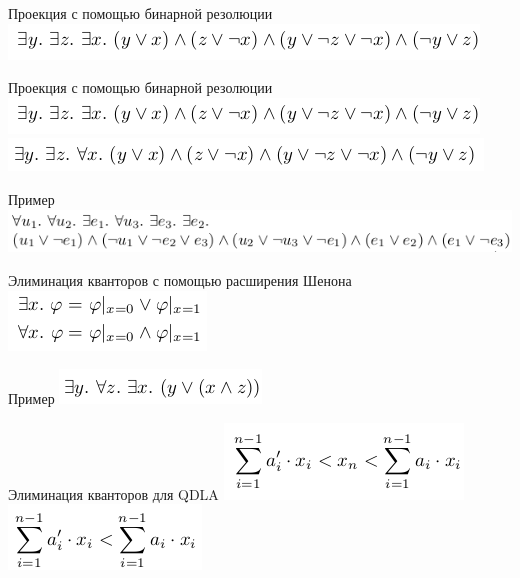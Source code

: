 \documentclass{beamer}
\begin{document}
\begin{frame}{Проекция с помощью бинарной резолюции}
\includegraphics[scale=0.5]{reduction1.png}\newline
\end{frame}

\begin{frame}{Проекция с помощью бинарной резолюции}
\includegraphics[scale=0.5]{reduction1.png}\newline
\includegraphics[scale=0.5]{reduction2.png}\newline
\end{frame}

\begin{frame}{Пример}
\includegraphics[scale=0.5]{reduction_ex.png}\newline
\end{frame}

\begin{frame}{Элиминация кванторов с помощью расширения Шенона}
\includegraphics[scale=0.5]{expansion_based.png}\newline
\end{frame}

\begin{frame}{Пример}
\includegraphics[scale=0.5]{expansion_based_ex.png}\newline
\end{frame}

\begin{frame}{Элиминация кванторов для QDLA}
\includegraphics[scale=0.5]{linear1.png}\newline
\includegraphics[scale=0.5]{linear2.png}\newline
\end{frame}
\end{document}
